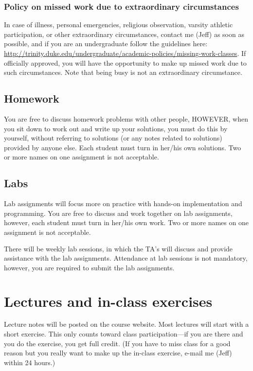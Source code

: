 \documentclass[12pt]{article}
\begin{document}
\subsubsection*{Policy on missed work due to extraordinary circumstances}

In case of illness, personal emergencies, religious observation, varsity athletic participation, or other extraordinary circumstances, contact me (Jeff) as soon as possible, and if you are an undergraduate follow the guidelines here:
\url{http://trinity.duke.edu/undergraduate/academic-policies/missing-work-classes}.
If officially approved, you will have the opportunity to make up missed work due to such circumstances.
Note that being busy is not an extraordinary circumstance.


\subsection{Homework}

You are free to discuss homework problems with other people, HOWEVER, when you sit down to work out and write up your solutions, you must do this by yourself, without referring to solutions (or any notes related to solutions) provided by anyone else. Each student must turn in her/his own solutions. Two or more names on one assignment is not acceptable.


\subsection{Labs}

Lab assignments will focus more on practice with hands-on implementation and programming. You are free to discuss and work together on lab assignments, however, each student must turn in her/his own work. Two or more names on one assignment is not acceptable.

There will be weekly lab sessions, in which the TA's will discuss and provide assistance with the lab assignments. Attendance at lab sessions is not mandatory, however, you are required to submit the lab assignments.


\section{Lectures and in-class exercises}

Lecture notes will be posted on the course website.  
Most lectures will start with a short exercise. This only counts toward class participation---if you are there and you do the exercise, you get full credit. (If you have to miss class for a good reason but you really want to make up the in-class exercise, e-mail me (Jeff) within 24 hours.)
\end{document}
